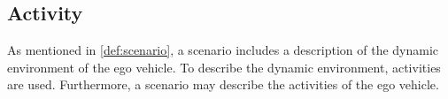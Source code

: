 


\subsection{Activity}
\label{sec:activity}

As mentioned in \cref{def:scenario}, a scenario  includes  a description of the dynamic environment of the ego vehicle. To describe the dynamic environment, activities are used. Furthermore, a scenario may describe the activities of the ego vehicle. 

